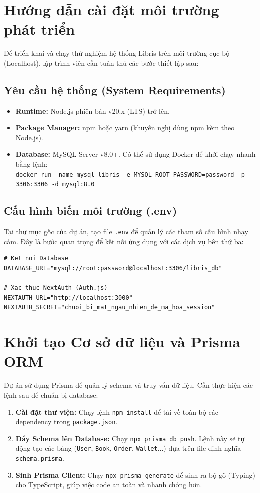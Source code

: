 \documentclass[../main.tex]{subfiles}
\begin{document}
\section{Hướng dẫn cài đặt môi trường phát triển}
Để triển khai và chạy thử nghiệm hệ thống Libris trên môi trường cục bộ (Localhost), lập trình viên cần tuân thủ các bước thiết lập sau:

\subsection{Yêu cầu hệ thống (System Requirements)}
\begin{itemize}
    \item \textbf{Runtime:} Node.js phiên bản v20.x (LTS) trở lên.
    \item \textbf{Package Manager:} npm hoặc yarn (khuyến nghị dùng npm kèm theo Node.js).
    \item \textbf{Database:} MySQL Server v8.0+. Có thể sử dụng Docker để khởi chạy nhanh bằng lệnh: \\ \texttt{docker run --name mysql-libris -e MYSQL\_ROOT\_PASSWORD=password -p 3306:3306 -d mysql:8.0}
\end{itemize}

\subsection{Cấu hình biến môi trường (.env)}
Tại thư mục gốc của dự án, tạo file \texttt{.env} để quản lý các tham số cấu hình nhạy cảm. Đây là bước quan trọng để kết nối ứng dụng với các dịch vụ bên thứ ba:
\begin{lstlisting}
# Ket noi Database
DATABASE_URL="mysql://root:password@localhost:3306/libris_db"

# Xac thuc NextAuth (Auth.js)
NEXTAUTH_URL="http://localhost:3000"
NEXTAUTH_SECRET="chuoi_bi_mat_ngau_nhien_de_ma_hoa_session"
\end{lstlisting}

\section{Khởi tạo Cơ sở dữ liệu và Prisma ORM}
Dự án sử dụng Prisma để quản lý schema và truy vấn dữ liệu. Cần thực hiện các lệnh sau để chuẩn bị database:
\begin{enumerate}
    \item \textbf{Cài đặt thư viện:} Chạy lệnh \texttt{npm install} để tải về toàn bộ các dependency trong \texttt{package.json}.
    \item \textbf{Đẩy Schema lên Database:} Chạy \texttt{npx prisma db push}. Lệnh này sẽ tự động tạo các bảng (\texttt{User}, \texttt{Book}, \texttt{Order}, \texttt{Wallet}...) dựa trên file định nghĩa \texttt{schema.prisma}.
    \item \textbf{Sinh Prisma Client:} Chạy \texttt{npx prisma generate} để sinh ra bộ gõ (Typing) cho TypeScript, giúp việc code an toàn và nhanh chóng hơn.
\end{enumerate}
\end{document}
